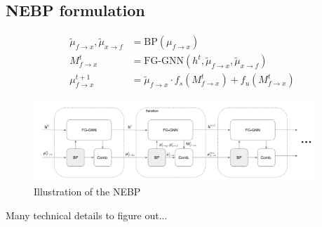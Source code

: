 \documentclass{article}
\begin{document}
\newpage
\subsection*{NEBP formulation}
\begin{align*}
  \tilde{\mu}_{f \rightarrow x}, \tilde{\mu}_{x \rightarrow f} &= \text{BP}(\mu_{f \rightarrow x}) \\
  M_{f \rightarrow x}^t &= \text{FG-GNN}(h^t, \tilde{\mu}_{f \rightarrow x}, \tilde{\mu}_{x \rightarrow f}) \\
  \mu_{f \rightarrow x}^{t+1} &= \tilde{\mu}_{f \rightarrow x} \cdot f_s(M_{f \rightarrow x}^t) + f_u(M_{f \rightarrow x}^t)
\end{align*}
\begin{figure}[htb]
  \centering
  \includegraphics[width=0.95\textwidth]{NEBP_illustration.png}
  \caption{Illustration of the NEBP}
  \label{fig:nebp}
\end{figure}
Many technical details to figure out...
\end{document}
